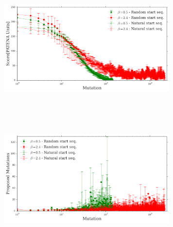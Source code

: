 \documentclass{beamer}
\begin{document}


% 
% 
% 
% 
% 









\begin{frame}
\begin{adjustwidth}{-2.0em}{-2.0em}
\includegraphics[width=340px,height=250px]{../img/iterationVsScore-mean.png} 
\end{adjustwidth}
\end{frame}




\begin{frame}
\begin{adjustwidth}{-2.0em}{-2.0em}
\includegraphics[width=340px,height=250px]{../img/iterationVsMutAttempts-mean.png} 
\end{adjustwidth}
\end{frame}
\end{document}
